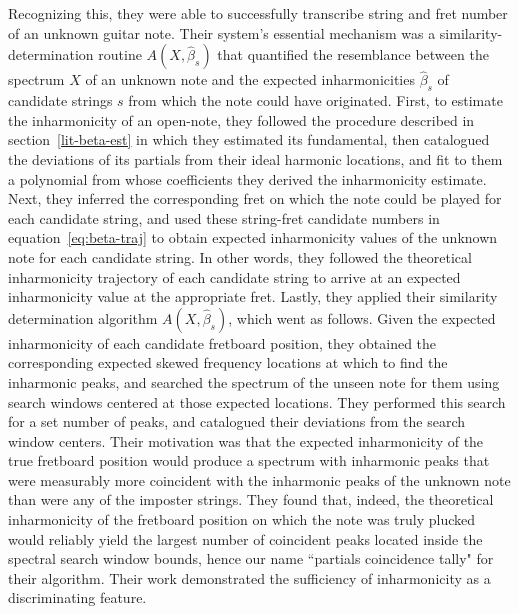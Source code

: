 \documentclass[12pt]{cmuthesis}
\begin{document}
Recognizing this, they were able to successfully transcribe string and fret number of an unknown guitar note. Their system's essential mechanism was a similarity-determination routine $A(X,\hat{\beta}_s)$ that quantified the resemblance between the spectrum $X$ of an unknown note and the expected inharmonicities $\hat\beta_s$ of candidate strings $s$ from which the note could have originated. First, to estimate the inharmonicity of an open-note, they followed the procedure described in section~\ref{lit-beta-est} in which they estimated its fundamental, then catalogued the deviations of its partials from their ideal harmonic locations, and fit to them a polynomial from whose coefficients they derived the inharmonicity estimate. Next, they inferred the corresponding fret on which the note could be played for each candidate string, and used these string-fret candidate numbers in equation~\eqref{eq:beta-traj} to obtain expected inharmonicity values of the unknown note for each candidate string. In other words, they followed the theoretical inharmonicity trajectory of each candidate string to arrive at an expected inharmonicity value at the appropriate fret. Lastly, they applied their similarity determination algorithm $A(X,\hat{\beta}_s)$, which went as follows. Given the expected inharmonicity of each candidate fretboard position, they obtained the corresponding expected skewed frequency locations at which to find the inharmonic peaks, and searched the spectrum of the unseen note for them using search windows centered at those expected locations. They performed this search for a set number of peaks, and catalogued their deviations from the search window centers. Their motivation was that the expected inharmonicity of the true fretboard position would produce a spectrum with inharmonic peaks that were measurably more coincident with the inharmonic peaks of the unknown note than were any of the imposter strings. They found that, indeed, the theoretical inharmonicity of the fretboard position on which the note was truly plucked would reliably yield the largest number of coincident peaks located inside the spectral search window bounds, hence our name ``partials coincidence tally" for their algorithm. Their work demonstrated the sufficiency of inharmonicity as a discriminating feature.
\end{document}
